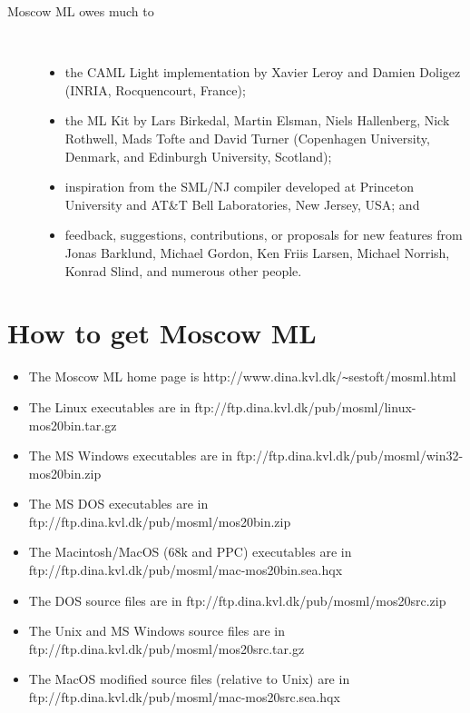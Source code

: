 \documentclass[fleqn]{article}
\begin{document}
\begin{description}
\item[Moscow ML owes much to]\mbox{ }
\begin{itemize}
\item the CAML Light implementation by Xavier Leroy and Damien
  Doligez (INRIA, Rocquencourt, France);
\item the ML Kit by Lars Birkedal, Martin Elsman, Niels Hallenberg,
  Nick Rothwell, Mads Tofte and David Turner (Copenhagen University,
  Denmark, and Edinburgh University, Scotland);
\item inspiration from the SML/NJ compiler developed at Princeton
  University and AT\&T Bell Laboratories, New Jersey, USA; and
\item feedback, suggestions, contributions, or proposals for new
  features from Jonas Barklund, Michael Gordon, Ken Friis Larsen,
  Michael Norrish, Konrad Slind, and numerous other people.
\end{itemize}
\end{description}


\section{How to get Moscow ML}
\label{sec-how-to-get}

\begin{itemize}
\item The Moscow ML home page is
        http://www.dina.kvl.dk/\verb#~#sestoft/mosml.html
\item The Linux executables are in
        ftp://ftp.dina.kvl.dk/pub/mosml/linux-mos20bin.tar.gz
\item The MS Windows executables are in 
        ftp://ftp.dina.kvl.dk/pub/mosml/win32-mos20bin.zip
\item The MS DOS executables are in 
        ftp://ftp.dina.kvl.dk/pub/mosml/mos20bin.zip
\item The Macintosh/MacOS (68k and PPC) executables are in\\
        ftp://ftp.dina.kvl.dk/pub/mosml/mac-mos20bin.sea.hqx
\item The DOS source files are in 
        ftp://ftp.dina.kvl.dk/pub/mosml/mos20src.zip
\item The Unix and MS Windows source files are in 
        ftp://ftp.dina.kvl.dk/pub/mosml/mos20src.tar.gz
\item The MacOS modified source files (relative to Unix) are in\\
        ftp://ftp.dina.kvl.dk/pub/mosml/mac-mos20src.sea.hqx
\end{itemize}
\end{document}
